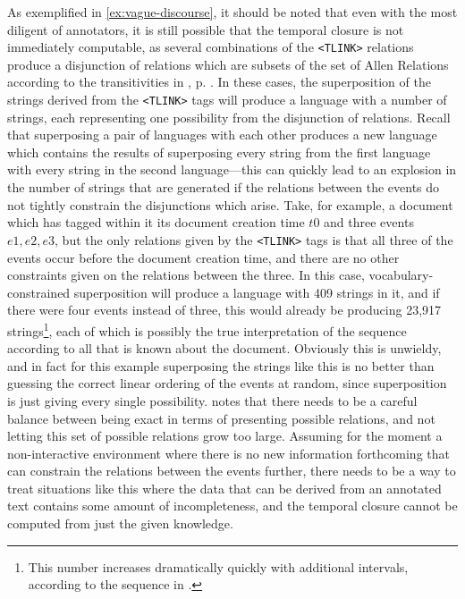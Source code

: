 \documentclass[a4paper,12pt,leqno,twoside]{article}
\begin{document}
As exemplified in \cref{ex:vague-discourse}, it should be noted that even with the most diligent of annotators, it is still possible that the temporal closure is not immediately computable, as several combinations of the \verb|<TLINK>| relations produce a disjunction of relations which are subsets of the set of Allen Relations according to the transitivities in , p. \pageref{tab:allen-trans-table}. In these cases, the superposition of the strings derived from the \verb|<TLINK>| tags will produce a language with a number of strings, each representing one possibility from the disjunction of relations. Recall that superposing a pair of languages with each other produces a new language which contains the results of superposing every string from the first language with every string in the second language---this can quickly lead to an explosion in the number of strings that are generated if the relations between the events do not tightly constrain the disjunctions which arise. Take, for example, a document which has tagged within it its document creation time $t0$ and three events $e1, e2, e3$, but the only relations given by the \verb|<TLINK>| tags is that all three of the events occur before the document creation time, and there are no other constraints given on the relations between the three. In this case, vocabulary-constrained superposition will produce a language with 409 strings in it, and if there were four events instead of three, this would already be producing 23,917 strings\footnote{This number increases dramatically quickly with additional intervals, according to the sequence in \citet{oeisA055203}.}, each of which is possibly the true interpretation of the sequence according to all that is known about the document. Obviously this is unwieldy, and in fact for this example superposing the strings like this is no better than guessing the correct linear ordering of the events at random, since superposition is just giving every single possibility. \citet{derczynski2016representation} notes that there needs to be a careful balance between being exact in terms of presenting possible relations, and not letting this set of possible relations grow too large. Assuming for the moment a non-interactive environment where there is no new information forthcoming that can constrain the relations between the events further, there needs to be a way to treat situations like this where the data that can be derived from an annotated text contains some amount of incompleteness, and the temporal closure cannot be computed from just the given knowledge.
\end{document}
